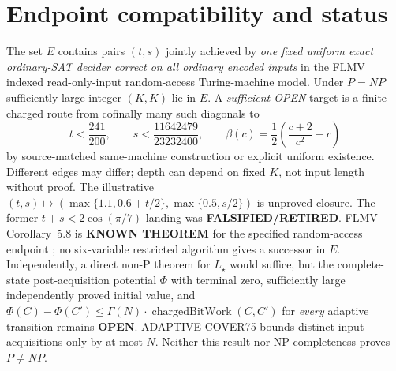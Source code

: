 \documentclass[11pt]{article}
\begin{document}
\section{Endpoint compatibility and status}
The set \(E\) contains pairs \((t,s)\) jointly achieved by \emph{one fixed uniform exact ordinary-SAT decider correct on all ordinary encoded inputs} in the FLMV indexed read-only-input random-access Turing-machine model. Under \(P=NP\) sufficiently large integer \((K,K)\) lie in \(E\). A \emph{sufficient OPEN} target is a finite charged route from cofinally many such diagonals to
\[
t<\frac{241}{200},\qquad
s<\frac{11642479}{23232400},\qquad
\beta(c)=\frac12\left(\frac{c+2}{c^2}-c\right)
\]
by source-matched same-machine construction or explicit uniform existence. Different edges may differ; depth can depend on fixed \(K\), not input length without proof. The illustrative \((t,s)\mapsto(\max\{1.1,0.6+t/2\},\max\{0.5,s/2\})\) is unproved closure. The former \(t+s<2\cos(\pi/7)\) landing was \textbf{FALSIFIED/RETIRED}. FLMV Corollary~5.8 is \textbf{KNOWN THEOREM} for the specified random-access endpoint \cite{FLMV}; no six-variable restricted algorithm gives a successor in \(E\). Independently, a direct non-P theorem for \(L_\star\) would suffice, but the complete-state post-acquisition potential \(\Phi\) with terminal zero, sufficiently large independently proved initial value, and \(\Phi(C)-\Phi(C')\le\Gamma(N)\cdot\operatorname{chargedBitWork}(C,C')\) for \emph{every} adaptive transition remains \textbf{OPEN}. ADAPTIVE-COVER75 bounds distinct input acquisitions only by at most \(N\). Neither this result nor NP-completeness proves \(P\neq NP\).
\end{document}
